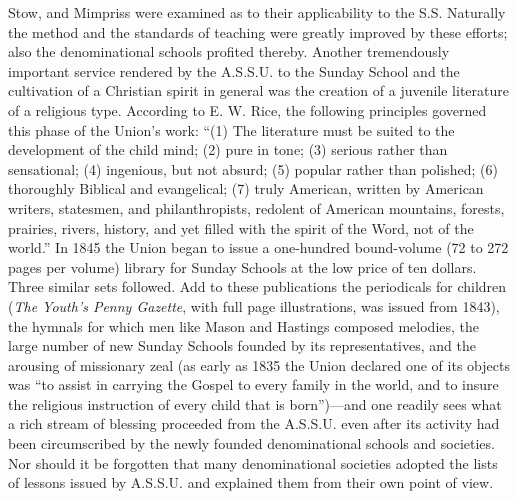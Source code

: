 Stow, and Mimpriss were examined as to their applicability to the S.S. Naturally the method and the standards of teaching were greatly improved by these efforts; also the denominational schools profited thereby. Another tremendously important service rendered by the A.S.S.U. to the Sunday School and the cultivation of a Christian spirit in general was the creation of a juvenile literature of a religious type. According to E. W. Rice, the following principles governed this phase of the Union’s work: “(1) The literature must be suited to the development of the child mind; (2) pure in tone; (3) serious rather than sensational; (4) ingenious, but not absurd; (5) popular rather than polished; (6) thoroughly Biblical and evangelical; (7) truly American, written by American writers, statesmen, and philanthropists, redolent of American mountains, forests, prairies, rivers, history, and yet filled with the spirit of the Word, not of the world.” In 1845 the Union began to issue a one-hundred bound-volume (72 to 272 pages per volume) library for Sunday Schools at the low price of ten dollars. Three similar sets followed. Add to these publications the periodicals for children (\emph{The Youth’s Penny Gazette}, with full page illustrations, was issued from 1843), the hymnals for which men like Mason and Hastings composed melodies, the large number of new Sunday Schools founded by its representatives, and the arousing of missionary zeal (as early as 1835 the Union declared one of its objects was “to assist in carrying the Gospel to every family in the world, and to insure the religious instruction of every child that is born”)—and one readily sees what a rich stream of blessing proceeded from the A.S.S.U. even after its activity had been circumscribed by the newly founded denominational schools and societies. Nor should it be forgotten that many denominational societies adopted the lists of lessons issued by A.S.S.U. and explained them from their own point of view.
